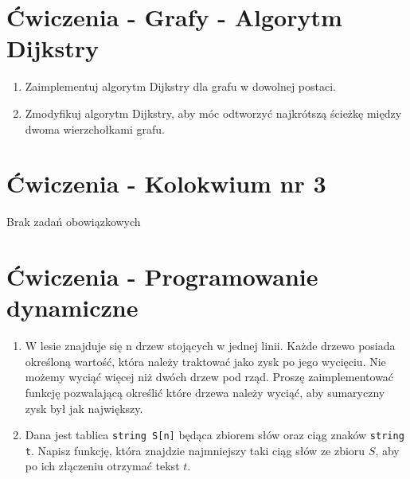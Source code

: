 \documentclass[11pt]{article}
\begin{document}
\section{Ćwiczenia - Grafy - Algorytm Dijkstry}

\begin{enumerate}
	
	\item Zaimplementuj algorytm Dijkstry dla grafu w dowolnej postaci.
	\item Zmodyfikuj algorytm Dijkstry, aby móc odtworzyć najkrótszą ścieżkę między dwoma wierzchołkami grafu.
	
\end{enumerate}
	
\section{Ćwiczenia - Kolokwium nr 3}
	Brak zadań obowiązkowych
	
\section{Ćwiczenia - Programowanie dynamiczne}
\begin{enumerate}
	
	\item W lesie znajduje się n drzew stojących w jednej linii. Każde drzewo posiada określoną wartość, która należy traktować jako zysk po jego wycięciu. Nie możemy wyciąć więcej niż dwóch drzew pod rząd. Proszę zaimplementować funkcję pozwalającą określić które drzewa należy wyciąć, aby sumaryczny zysk był jak największy.
	\item Dana jest tablica \texttt{string S[n]} będąca zbiorem słów oraz ciąg znaków \texttt{string t}. Napisz funkcję, która znajdzie najmniejszy taki ciąg słów ze zbioru $S$, aby po ich złączeniu otrzymać tekst $t$.
	
\end{enumerate}
	
\end{document}

